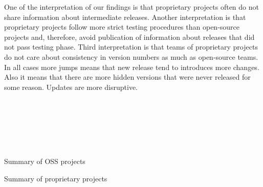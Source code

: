 \documentclass[conference]{IEEEtran}
\begin{document}
One of the interpretation of our findings is that proprietary projects often do not share information about intermediate releases. Another interpretation is that proprietary projects follow more strict testing procedures than open-source projects and, therefore, avoid publication of information about releases that did not pass testing phase.  Third interpretation is that teams of proprietary projects do not care about consistency in version numbers as much as open-source teams.
In all cases more jumps means that new release tend to introduces more changes. Also it means that there are more hidden versions that were never released for some reason. Updates are more disruptive. 

\\
\\
\\
\\
\\

\begin{table*}[htb]
\begin{adjustbox}{width=\textwidth}
\end{adjustbox}
\caption{Summary of OSS projects}
\label{tab:ossProjectsInfo}
\end{table*}

\begin{table*}[htb]
\begin{adjustbox}{width=\textwidth}
\end{adjustbox}
\caption{Summary of proprietary projects}
\label{tab:proprietaryProjectsInfo}
\end{table*}

\begin{table*}[htb]
\begin{adjustbox}{width=\textwidth}
\end{adjustbox}
\end{table*}

\subsection{\RQTwo}
\begin{table*}[htb]
\begin{adjustbox}{width=\textwidth}
\end{adjustbox}
\end{table*}
\end{document}
